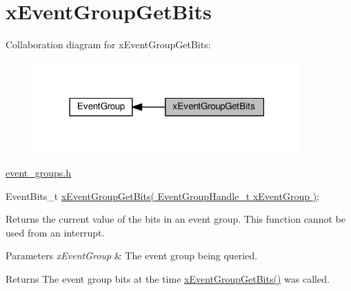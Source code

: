 \hypertarget{group__x_event_group_get_bits}{}\section{x\+Event\+Group\+Get\+Bits}
\label{group__x_event_group_get_bits}
Collaboration diagram for x\+Event\+Group\+Get\+Bits\+:\nopagebreak
\begin{figure}[H]
\begin{center}
\leavevmode
\includegraphics[width=291pt]{group__x_event_group_get_bits}
\end{center}
\end{figure}
\hyperlink{event__groups_8h}{event\+\_\+groups.\+h} 
\begin{DoxyPre}
   EventBits\_t \hyperlink{event__groups_8h_a0ae86f092fb07ccb475ae938f9a12584}{xEventGroupGetBits( EventGroupHandle\_t xEventGroup )};
\end{DoxyPre}


Returns the current value of the bits in an event group. This function cannot be used from an interrupt.


\begin{DoxyParams}{Parameters}
{\em x\+Event\+Group} & The event group being queried.\\
\hline
\end{DoxyParams}
\begin{DoxyReturn}{Returns}
The event group bits at the time \hyperlink{event__groups_8h_a0ae86f092fb07ccb475ae938f9a12584}{x\+Event\+Group\+Get\+Bits()} was called. 
\end{DoxyReturn}
